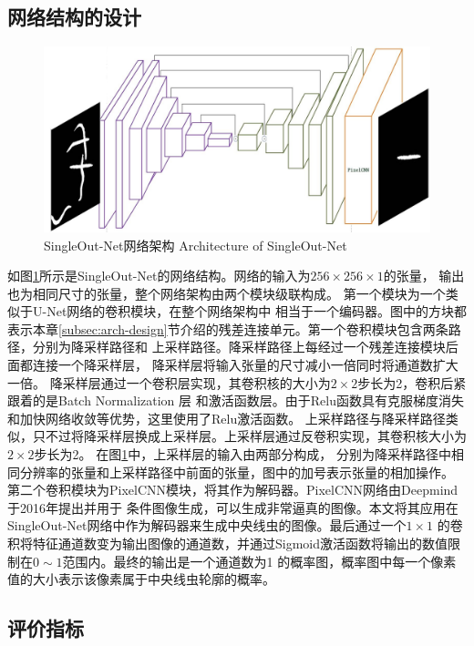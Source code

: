 \subsection{网络结构的设计}
\label{archtecture}
\begin{figure}[htb]
	  \centering
	  \includegraphics[width=14cm]{figure/chap4/arch1.jpg}
	  \bicaption
		{SingleOut-Net网络架构}
		{Architecture of SingleOut-Net}
	  \label{fig:chap4:netarch}
	\end{figure}
	如图\ref{fig:chap4:netarch}所示是SingleOut-Net的网络结构。网络的输入为$256\times256\times1$的张量，
	输出也为相同尺寸的张量，整个网络架构由两个模块级联构成。
	第一个模块为一个类似于U-Net网络\cite{ronneberger2015u}的卷积模块，在整个网络架构中
	相当于一个编码器。图中的方块都表示本章\ref{subsec:arch-design}节介绍的残差连接单元。第一个卷积模块包含两条路径，分别为降采样路径和
	上采样路径。降采样路径上每经过一个残差连接模块后面都连接一个降采样层，
	降采样层将输入张量的尺寸减小一倍同时将通道数扩大一倍。
	降采样层通过一个卷积层实现，其卷积核的大小为$2\times2$步长为2，卷积后紧跟着的是Batch Normalization 层
	和激活函数层。由于Relu函数\cite{xu2015empirical}具有克服梯度消失和加快网络收敛等优势，这里使用了Relu激活函数。
	上采样路径与降采样路径类似，只不过将降采样层换成上采样层。上采样层通过反卷积实现，其卷积核大小为$2\times2$步长为2。
	在图\ref{fig:chap4:netarch}中，上采样层的输入由两部分构成，
	分别为降采样路径中相同分辨率的张量和上采样路径中前面的张量，图中的加号表示张量的相加操作。
	第二个卷积模块为PixelCNN\cite{van2016conditional}模块，将其作为解码器。PixelCNN网络由Deepmind于2016年提出并用于
	条件图像生成，可以生成非常逼真的图像。本文将其应用在SingleOut-Net网络中作为解码器来生成中央线虫的图像。最后通过一个$1\times1$
	的卷积将特征通道数变为输出图像的通道数，并通过Sigmoid激活函数将输出的数值限制在$0\sim1$范围内。最终的输出是一个通道数为1
	的概率图，概率图中每一个像素值的大小表示该像素属于中央线虫轮廓的概率。

\subsection{评价指标}
	
